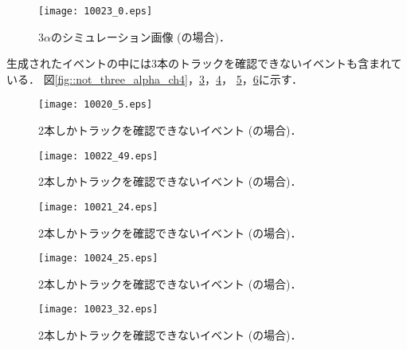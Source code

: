 \documentclass[../master]{subfiles}
\begin{document}
\begin{figure}
  \centering
  \texttt{[image: 10023\_0.eps]}
  \caption{3$\alpha$のシミュレーション画像 (\isoButaneHerium の場合)．}
  \label{fig::three_alpha_ic4h10_he}
\end{figure}

生成されたイベントの中には3本のトラックを確認できないイベントも含まれている．
図\ref{fig::not_three_alpha_ch4}，\ref{fig::not_three_alpha_ch4_h2}，\ref{fig::not_three_alpha_ch4_he}，
\ref{fig::not_three_alpha_ic4h10_h2}，\ref{fig::not_three_alpha_ic4h10_he}に示す．
\begin{figure}
  \centering
  \texttt{[image: 10020\_5.eps]}
  \caption{2本しかトラックを確認できないイベント (\Methane の場合)．}
  \label{fig::not_three_aalpha_ch4}
\end{figure}
\begin{figure}
  \centering
  \texttt{[image: 10022\_49.eps]}
  \caption{2本しかトラックを確認できないイベント (\MethaneHydro の場合)．}
  \label{fig::not_three_alpha_ch4_h2}
\end{figure}
\begin{figure}
  \centering
  \texttt{[image: 10021\_24.eps]}
  \caption{2本しかトラックを確認できないイベント (\MethaneHerium の場合)．}
  \label{fig::not_three_alpha_ch4_he}
\end{figure}
\begin{figure}
  \centering
  \texttt{[image: 10024\_25.eps]}
  \caption{2本しかトラックを確認できないイベント (\isoButaneHydro の場合)．}
  \label{fig::not_three_alpha_ic4h10_h2}
\end{figure}
\begin{figure}
  \centering
  \texttt{[image: 10023\_32.eps]}
  \caption{2本しかトラックを確認できないイベント (\isoButaneHerium の場合)．}
  \label{fig::not_three_alpha_ic4h10_he}
\end{figure}
\end{document}
